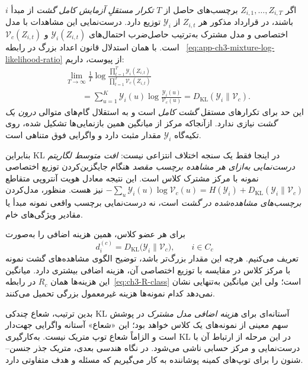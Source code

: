 اگر $Z_{i,1},\ldots,Z_{i,T}$
برچسب‌های حاصل از $T$
\emph{تکرار مستقلِ آزمایش کامل گشت}
از مبدأ $i$ باشند، در قرارداد
مذکور هر $Z_{i,t}$ از
$\mathscr Y_i$ توزیع دارد.
درست‌نمایی این مشاهدات
با مدل اختصاصی و مدل مشترک
به‌ترتیب حاصل‌ضرب احتمال‌های
$\mathscr Y_i(Z_{i,t})$
و $\mathcal V_c(Z_{i,t})$
است. با همان استدلال قانون
اعداد بزرگ در رابطه~
\eqref{eq:app-ch3-mixture-log-likelihood-ratio}
از پیوست، داریم:
\begin{equation}\label{eq:ch3-outlier-kl-likelihood-decomposition}
\boxed{
\begin{aligned}
&\lim_{T\to\infty}\frac1T
\log\frac{
\prod_{t=1}^{T}\mathscr Y_i(Z_{i,t})
}{
\prod_{t=1}^{T}\mathcal V_c(Z_{i,t})
}\\
&\qquad
=\sum_{u=1}^{K}\mathscr Y_i(u)
\log\frac{\mathscr Y_i(u)}{\mathcal V_c(u)}
=D_{\mathrm{KL}}(\mathscr Y_i\|\mathcal V_c).
\end{aligned}}
\end{equation}
این حد برای تکرارهای مستقل
\emph{گشت کامل} است و به
استقلال گام‌های متوالی
\emph{درون یک گشت} نیازی ندارد.
ازآنجاکه مرکز از میانگین
همین بازنمایی‌ها تشکیل شده،
روی تکیه‌گاه $\mathscr Y_i$
مقدار مثبت دارد و واگرایی
فوق متناهی است.

بنابراین KL در اینجا فقط
یک سنجه اختلاف انتزاعی نیست:
\emph{افت متوسط لگاریتم درست‌نمایی
به‌ازای هر مشاهده برچسب مقصد}
هنگام جایگزین‌کردن توزیع
اختصاصی نمونه با مرکز مشترک
کلاس است. این نتیجه معادل
هویت آنتروپی متقاطع
$-\sum_u\mathscr Y_i(u)
\log\mathcal V_c(u)
=H(\mathscr Y_i)+
D_{\mathrm{KL}}(\mathscr Y_i\|\mathcal V_c)$
نیز هست. منظور، مدل‌کردن
\emph{برچسب‌های مشاهده‌شده در گشت}
است، نه درست‌نمایی برچسب
واقعی نمونه مبدأ یا مقادیر
ویژگی‌های خام.

برای هر عضو کلاس، همین
هزینه اضافی را به‌صورت
\begin{equation}\label{eq:ch3-outlier-forward-kl}
d_i^{(c)}
=D_{\mathrm{KL}}\bigl(
\mathscr Y_i\|\mathcal V_c\bigr),
\qquad i\in C_c
\end{equation}
تعریف می‌کنیم. هرچه این
مقدار بزرگ‌تر باشد، توضیح
الگوی مشاهده‌های گشت نمونه
با مرکز کلاس در مقایسه با
توزیع اختصاصی آن، هزینه
اضافی بیشتری دارد.
میانگین این هزینه‌ها همان
$R_c$ در رابطه~\eqref{eq:ch3-R-class}
است؛ ولی این میانگین
به‌تنهایی نشان نمی‌دهد کدام
نمونه‌ها هزینه غیرمعمول
بزرگی تحمیل می‌کنند.

بدین ترتیب، شعاع چندکی KL
آستانه‌ای برای \emph{هزینه
اضافی مدل مشترک} در پوشش
سهم معینی از نمونه‌های
یک کلاس خواهد بود؛ این
«شعاع» آستانه واگرایی
جهت‌دار است و الزاماً
شعاع توپ متریک نیست.
به‌کارگیری KL در این
مرحله از ارتباط آن با
درست‌نمایی و مرکز حسابی
ناشی می‌شود. در نگاه
هندسی بعدی، متریک
جذر جنسن--شنون را
برای توپ‌های کمینه پوشاننده
به کار می‌گیریم که مسئله
و هدف متفاوتی دارد.


